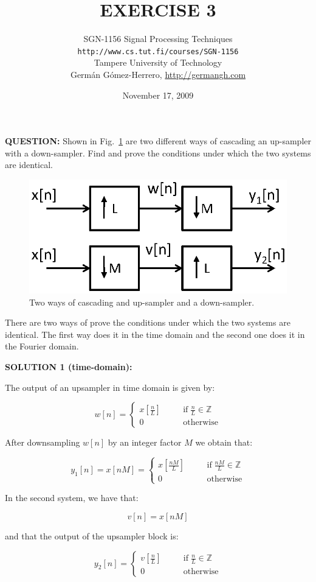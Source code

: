 \documentclass[a4paper,11pt,oneside]{article}
\title{\large{\textbf{EXERCISE 3}}}
\author{SGN-1156 Signal Processing Techniques\\
\texttt{http://www.cs.tut.fi/courses/SGN-1156}\\
Tampere University of Technology\\
Germ\'an G\'omez-Herrero, \url{http://germangh.com}}
\date{November 17, 2009}
\begin{document}
\maketitle

\textbf{QUESTION:} Shown in Fig.~\ref{fig1} are two different ways of cascading an up-sampler with a down-sampler. Find and prove the conditions under which the two systems are identical. 



\begin{figure}[h!]
\centering
\includegraphics[width=.5\textwidth]{fig3.eps}
\caption{Two ways of cascading and up-sampler and a down-sampler.}
\label{fig1}
\end{figure}

\vspace{1cm}

There are two ways of prove the conditions under which the two systems are identical. The first way does it in the time domain and the second one does it in the Fourier domain. 

\textbf{SOLUTION 1 (time-domain):}

The output of an upsampler in time domain is given by:

\[
w[n] = \left\{
\begin{array}{lll}
x[\frac{n}{L}] & \quad& \textrm{if}\; \frac{n}{L} \in \mathbb{Z}\\
0 &\quad& \textrm{otherwise}
\end{array}
\right.
\]

After downsampling $w[n]$ by an integer factor $M$ we obtain that:

\[
y_1[n]=x[nM]=\left\{
\begin{array}{lll}
x[\frac{nM}{L}] & \quad& \textrm{if}\; \frac{nM}{L} \in \mathbb{Z}\\
0 &\quad& \textrm{otherwise}
\end{array}
\right.
\]

In the second system, we have that:

\[
v[n] = x[nM]
\]

and that the output of the upsampler block is:

\[
y_2[n] = \left\{
\begin{array}{lll}
v[\frac{n}{L}] & \quad& \textrm{if}\; \frac{n}{L} \in \mathbb{Z}\\
0 &\quad& \textrm{otherwise}
\end{array}
\right.
\]
\end{document}
